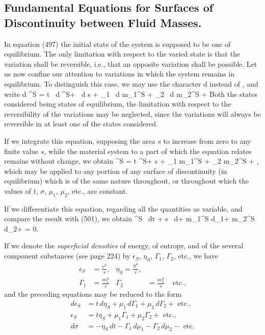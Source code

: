 \documentclass[12pt]{article}
\begin{document}
{\subsection{Fundamental Equations for Surfaces of Discontinuity between Fluid Masses.}
In equation (497) the initial state of the system is supposed to be one of equilibrium. The only limitation with respect to the varied state is that the variation shall be reversible, i.e., that an opposite variation shall be possible. Let us now confine our attention to variations in which the system remains in equilibrium. To distinguish this case, we may use the character d instead of , and write
\eqs d \epsilon^S = t \, d \eta^S+ \sigma \, d s + \mu_1 \, d m_1^S + \mu_2 \, d m_2^S +  \label{501} \eqe
Both the states considered being states of equilibrium, the limitation with respect to the reversibility of the variations may be neglected, since the variations will always be reversible in at least one of the states considered.


If we integrate this equation, supposing the area $s$ to increase from zero to any finite value $s$, while the material system to a part of which the equation relates remains without change, we obtain
\eqs   \epsilon^S = t \eta^S+ \sigma s + \mu_1  m_1^S + \mu_2 m_2^S + ,\label{502} \eqe
which may be applied to any portion of any surface of discontinuity (in equilibrium) which is of the same nature throughout, or throughout which the values of $t$, $\sigma$, $\mu_1$, $\mu_2$, etc., are constant.


If we differentiate this equation, regarding all the quantities as
variable, and compare the result with (501), we obtain
\eqs \eta^S \, dt + s \, d\sigma + m_1^S d\mu_1+ m_2^S d\mu_2+  = 0. \label{503} \eqe


If we denote the \textit{superficial densities} of energy, of entropy, and of the several component substances (see page 224) by $\epsilon_S$, $\eta_S$, $\Gamma_1$, $\Gamma_2$, etc., we have
\begin{align} \epsilon_S&=  \frac{\epsilon^S}{s},&    \eta_S=\frac{\eta^S}{s}, &  \label{504} \\
\Gamma_1 &= \frac{m_1^S}{s} & \Gamma_2 &= \frac{m_2^S}{s} & \text{ etc.},      \label{505}\end{align}
and the preceding equations may be reduced to the form
\begin{align}
d \epsilon_S &= t \, d \eta_S + \mu_1 \, d \Gamma_1 + \mu_2 \, d \Gamma_2+ \text{ etc.}, \label{506}\\
\epsilon_S &= t \eta_S + \mu_1 \Gamma_1 + \mu_2 \Gamma_2+ \text{ etc.}, \label{507}\\
d\sigma &= -\eta_S \, dt -\Gamma_1\,d \mu_1 -\Gamma_2\,d \mu_2- \text{ etc.}  \label{508} 
\end{align}

}
\end{document}

